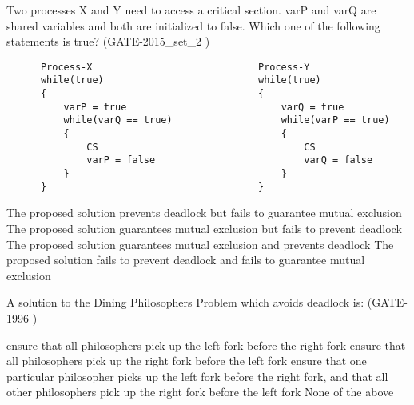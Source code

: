 \begin{questyle}

  \question  Two processes X and Y need to access a critical section. varP and varQ are shared variables and both are initialized to false. Which one of the following statements is true? (GATE-2015\_set\_2 )

  \begin{lstlisting}
      Process-X                             Process-Y
      while(true)                           while(true)
      {                                     {
          varP = true                           varQ = true
          while(varQ == true)                   while(varP == true)
          {                                     {
              CS                                    CS
              varP = false                          varQ = false
          }                                     }
      }                                     }
  \end{lstlisting}

  \begin{choices}
    \CorrectChoice The proposed solution prevents deadlock but fails to guarantee mutual exclusion
    \choice The proposed solution guarantees mutual exclusion but fails to prevent deadlock
    \choice The proposed solution guarantees mutual exclusion and prevents deadlock
    \choice The proposed solution fails to prevent deadlock and fails to guarantee mutual exclusion
  \end{choices}

  \end{questyle}


\begin{questyle}

  \question A solution to the Dining Philosophers Problem which avoids deadlock is: (GATE-1996 )

  \begin{choices}
    \choice ensure that all philosophers pick up the left fork before the right fork
    \choice ensure that all philosophers pick up the right fork before the left fork
    \CorrectChoice ensure that one particular philosopher picks up the left fork before the right fork, and that all other philosophers pick up the right fork before the left fork
    \choice None of the above
  \end{choices}

  \end{questyle}



